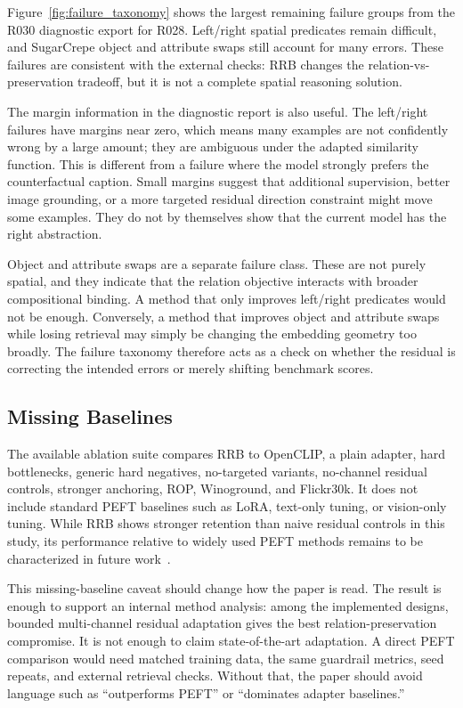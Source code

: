Figure~\ref{fig:failure_taxonomy} shows the largest remaining failure groups from the R030 diagnostic export for R028. Left/right spatial predicates remain difficult, and SugarCrepe object and attribute swaps still account for many errors. These failures are consistent with the external checks: RRB changes the relation-vs-preservation tradeoff, but it is not a complete spatial reasoning solution.

The margin information in the diagnostic report is also useful. The left/right failures have margins near zero, which means many examples are not confidently wrong by a large amount; they are ambiguous under the adapted similarity function. This is different from a failure where the model strongly prefers the counterfactual caption. Small margins suggest that additional supervision, better image grounding, or a more targeted residual direction constraint might move some examples. They do not by themselves show that the current model has the right abstraction.

Object and attribute swaps are a separate failure class. These are not purely spatial, and they indicate that the relation objective interacts with broader compositional binding. A method that only improves left/right predicates would not be enough. Conversely, a method that improves object and attribute swaps while losing retrieval may simply be changing the embedding geometry too broadly. The failure taxonomy therefore acts as a check on whether the residual is correcting the intended errors or merely shifting benchmark scores.

\subsection{Missing Baselines}

The available ablation suite compares RRB to OpenCLIP, a plain adapter, hard bottlenecks, generic hard negatives, no-targeted variants, no-channel residual controls, stronger anchoring, ROP, Winoground, and Flickr30k. It does not include standard PEFT baselines such as LoRA, text-only tuning, or vision-only tuning. While RRB shows stronger retention than naive residual controls in this study, its performance relative to widely used PEFT methods remains to be characterized in future work~\cite{hu2022lora}.

This missing-baseline caveat should change how the paper is read. The result is enough to support an internal method analysis: among the implemented designs, bounded multi-channel residual adaptation gives the best relation-preservation compromise. It is not enough to claim state-of-the-art adaptation. A direct PEFT comparison would need matched training data, the same guardrail metrics, seed repeats, and external retrieval checks. Without that, the paper should avoid language such as ``outperforms PEFT'' or ``dominates adapter baselines.''

